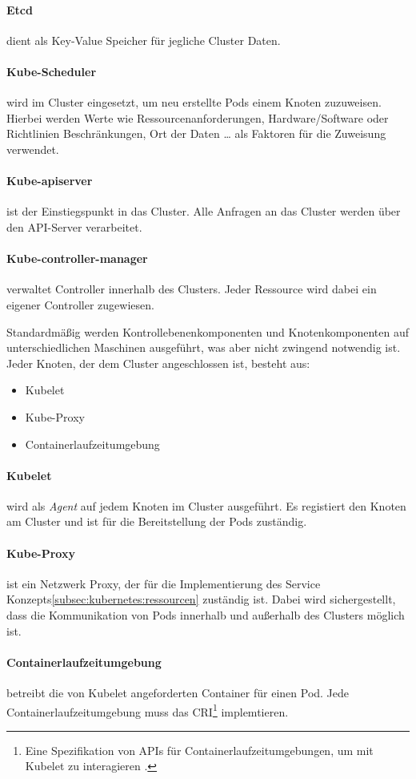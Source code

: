 \paragraph{Etcd} dient als Key-Value Speicher für jegliche Cluster Daten.
\paragraph{Kube-Scheduler} wird im Cluster eingesetzt, um neu erstellte Pods einem Knoten zuzuweisen.
Hierbei werden Werte wie Ressourcenanforderungen, Hardware/Software oder Richtlinien Beschränkungen, Ort der Daten \dots
als Faktoren für die Zuweisung verwendet.
\paragraph{Kube-apiserver} ist der Einstiegspunkt in das Cluster. 
Alle Anfragen an das Cluster werden über den API-Server verarbeitet.
\paragraph{Kube-controller-manager} verwaltet Controller innerhalb des Clusters.
Jeder Ressource wird dabei ein eigener Controller zugewiesen.

Standardmäßig werden Kontrollebenenkomponenten und Knotenkomponenten auf unterschiedlichen Maschinen ausgeführt,
was aber nicht zwingend notwendig ist. 
Jeder Knoten, der dem Cluster angeschlossen ist, besteht aus:
\begin{itemize}
  \item Kubelet
  \item Kube-Proxy
  \item Containerlaufzeitumgebung
\end{itemize}

\paragraph{Kubelet} wird als \emph{Agent} auf jedem Knoten im Cluster ausgeführt. 
Es registiert den Knoten am Cluster und ist für die Bereitstellung der Pods zuständig.
\paragraph{Kube-Proxy} ist ein Netzwerk Proxy, der für die Implementierung des Service Konzepts\ref{subsec:kubernetes:ressourcen}
zuständig ist. 
Dabei wird sichergestellt, dass die Kommunikation von Pods innerhalb und außerhalb des Clusters möglich ist.
\paragraph{Containerlaufzeitumgebung} betreibt die von Kubelet angeforderten Container für einen Pod. 
Jede Containerlaufzeitumgebung muss das 
\ac{CRI}\footnote{Eine Spezifikation von APIs für Containerlaufzeitumgebungen, um mit Kubelet zu interagieren \cite{cri}.} implemtieren.
